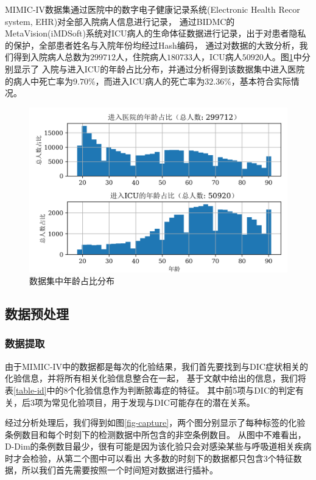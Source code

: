 \documentclass[12pt, a4paper, oneside]{ctexart}
\numberwithin{equation}{section}  %
\begin{document}
MIMIC-IV数据集通过医院中的数字电子健康记录系统(Electronic Health Recor system, EHR)对全部入院病人信息进行记录，
通过BIDMC的MetaVision(iMDSoft)系统对ICU病人的生命体征数据进行记录，出于对患者隐私的保护，全部患者姓名与入院年份均经过Hash编码，
通过对数据的大致分析，我们得到入院病人总数为$299712$人，住院病人$180733$人，ICU病人$50920$人。图\ref{fig-age}中分别显示了
入院与进入ICU的年龄占比分布，并通过分析得到该数据集中进入医院的病人中死亡率为$9.70\%$，而进入ICU病人的死亡率为$32.36\%$，基本符合实际情况。
\begin{figure}[H]
    \vspace{-1em}
    \includegraphics[width=\textwidth]{admission_vs_age_plot.png}
    \caption{数据集中年龄占比分布}
    \label{fig-age}
\end{figure}
\subsection{数据预处理}
\subsubsection{数据提取}
由于MIMIC-IV中的数据都是每次的化验结果，我们首先要找到与DIC症状相关的化验信息，并将所有相关化验信息整合在一起，
基于文献\cite{bib-determine-dic}中给出的信息，我们将表\ref{table-id}中的8个化验信息作为判断脓毒症的特征。
其中前5项与DIC的判定有关，后3项为常见化验项目，用于发现与DIC可能存在的潜在关系。

经过分析处理后，我们得到如图\ref{fig-capture}，两个图分别显示了每种标签的化验条例数目和每个时刻下的检测数据中所包含的非空条例数目。
从图中不难看出，D-Dim的条例数目最少，很有可能是因为该化验只会对感染某些与呼吸道相关疾病时才会检验，从第二个图中可以看出
大多数的时刻下的数据都只包含3个特征数据，所以我们首先需要按照一个时间短对数据进行插补。
\end{document}
